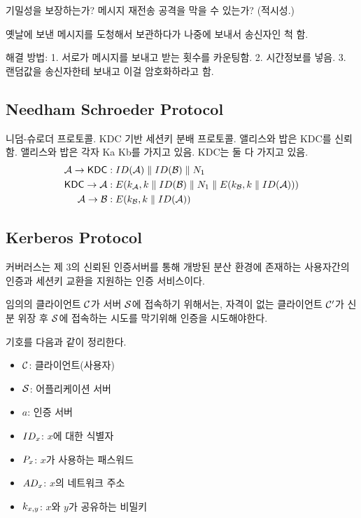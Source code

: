 기밀성을 보장하는가? 메시지 재전송 공격을 막을 수 있는가? (적시성.)

옛날에 보낸 메시지를 도청해서 보관하다가 나중에 보내서 송신자인 척 함.

해결 방법:
1. 서로가 메시지를 보내고 받는 횟수를 카운팅함.
2. 시간정보를 넣음.
3. 랜덤값을 송신자한테 보내고 이걸 암호화하라고 함.

\subsection{Needham Schroeder Protocol}

니덤-슈로더 프로토콜. KDC 기반 세션키 분배 프로토콜. 앨리스와 밥은 KDC를 신뢰함.
앨리스와 밥은 각자 Ka Kb를 가지고 있음. KDC는 둘 다 가지고 있음.
\begin{equation}
  \begin{split}
    \mathcal{A} \to \textsf{KDC} &: ID(\mathcal{A}) \parallel ID(\mathcal{B}) \parallel N_1 \\
    \textsf{KDC} \to \mathcal{A} &: E(k_{\mathcal{A}},
    k \parallel ID(\mathcal{B}) \parallel N_1 \parallel
    E(k_{\mathcal{B}}, k \parallel ID(\mathcal{A}))) \\
    \mathcal{A} \to \mathcal{B} &: E(k_{\mathcal{B}}, k \parallel ID(\mathcal{A}))
  \end{split}
\end{equation}

\newpage
\subsection{Kerberos Protocol}

커버러스는 제 3의 신뢰된 인증서버를 통해 개방된 분산 환경에 존재하는 사용자간의
인증과 세션키 교환을 지원하는 인증 서비스이다.

임의의 클라이언트 $\mathcal{C}$가 서버 $\mathcal{S}$에 접속하기 위해서는,
자격이 없는 클라이언트 $\mathcal{C}'$가 신분 위장 후 $\mathcal{S}$에 접속하는 시도를 막기위해
인증을 시도해야한다.

기호를 다음과 같이 정리한다.
\begin{itemize}
  \item $\mathcal{C}$: 클라이언트(사용자)
  \item $\mathcal{S}$: 어플리케이션 서버
  \item $a$: 인증 서버
  \item $ID_x$: $x$에 대한 식별자
  \item $P_x$: $x$가 사용하는 패스워드
  \item $AD_x$: $x$의 네트워크 주소
  \item $k_{x, y}$: $x$와 $y$가 공유하는 비밀키
\end{itemize}

